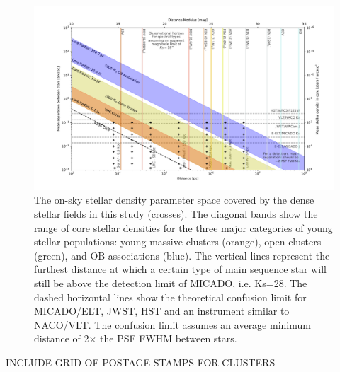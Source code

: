 \begin{figure}

    \centering
    \includegraphics[width=\textwidth]{images/resolved_stellar_densities.pdf}

    \caption{The on-sky stellar density parameter space covered by the dense stellar fields in this study (crosses). 
    The diagonal bands show the range of core stellar densities for the three major categories of young stellar populations: young massive clusters (orange), open clusters (green), and OB associations (blue). 
    The vertical lines represent the furthest distance at which a certain type of main sequence star will still be above the detection limit of MICADO, i.e. Ks=28\m.
    The dashed horizontal lines show the theoretical confusion limit for MICADO/ELT, JWST, HST and an instrument similar to NACO/VLT. The confusion limit assumes an average minimum distance of 2$\times$ the PSF FWHM between stars.
    }
    
    \label{fig:resolved_stellar_densities}
    
\end{figure}

\rewrite INCLUDE GRID OF POSTAGE STAMPS FOR CLUSTERS


